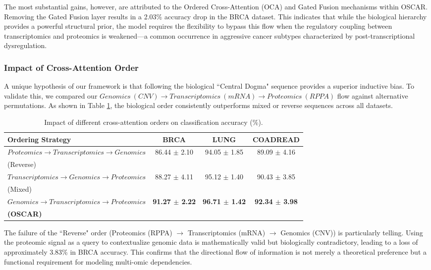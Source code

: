 \documentclass[lettersize,journal]{IEEEtran}
\begin{document}
The most substantial gains, however, are attributed to the Ordered Cross-Attention (OCA) and Gated Fusion mechanisms within OSCAR. Removing the Gated Fusion layer results in a 2.03\% accuracy drop in the BRCA dataset. This indicates that while the biological hierarchy provides a powerful structural prior, the model requires the flexibility to bypass this flow when the regulatory coupling between transcriptomics and proteomics is weakened—a common occurrence in aggressive cancer subtypes characterized by post-transcriptional dysregulation.

\subsubsection{Impact of Cross-Attention Order}
A unique hypothesis of our framework is that following the biological ``Central Dogma" sequence provides a superior inductive bias. To validate this, we compared our $Genomics\ (CNV) \rightarrow Transcriptomics\ (mRNA) \rightarrow Proteomics\ (RPPA)$ flow against alternative permutations. As shown in Table \ref{tab:ablation_order}, the biological order consistently outperforms mixed or reverse sequences across all datasets.

\begin{table}[!htbp]
\centering
\small
\caption{Impact of different cross-attention orders on classification accuracy (\%).}
\label{tab:ablation_order}
\begin{tabular}{lccc}
\hline

\textbf{Ordering Strategy} & \textbf{BRCA} & \textbf{LUNG} & \textbf{COADREAD} \\ \hline
$Proteomics \rightarrow Transcriptomics \rightarrow Genomics$ & 86.44 $\pm$ 2.10 & 94.05 $\pm$ 1.85 & 89.09 $\pm$ 4.16 \\
(Reverse) \\
$Transcriptomics \rightarrow Genomics \rightarrow Proteomics $ & 88.27 $\pm$ 4.11 & 95.12 $\pm$ 1.40 & 90.43 $\pm$ 3.85 \\
(Mixed) \\
\textbf{$ Genomics \rightarrow Transcriptomics \rightarrow Proteomics $} & \textbf{91.27 $\pm$ 2.22} & \textbf{96.71 $\pm$ 1.42} & \textbf{92.34 $\pm$ 3.98} \\ 
\textbf{(OSCAR)}\\ 

\hline
\end{tabular}
\end{table}


The failure of the ``Reverse" order (Proteomics (RPPA) $\rightarrow$ Transcriptomics (mRNA) $\rightarrow$ Genomics (CNV)) is particularly telling. Using the proteomic signal as a query to contextualize genomic data is mathematically valid but biologically contradictory, leading to a loss of approximately 3.83\% in BRCA accuracy. This confirms that the directional flow of information is not merely a theoretical preference but a functional requirement for modeling multi-omic dependencies.
\end{document}
